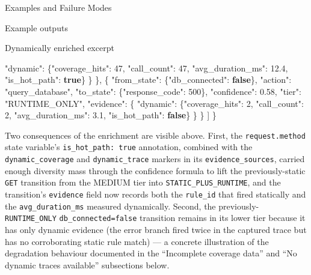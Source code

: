 \documentclass[
  ignorenonframetext,
]{beamer}
\newenvironment{Shaded}{}{}
\newcommand{\DataTypeTok}[1]{\textcolor[rgb]{0.56,0.13,0.00}{#1}}
\newcommand{\DecValTok}[1]{\textcolor[rgb]{0.25,0.63,0.44}{#1}}
\newcommand{\FloatTok}[1]{\textcolor[rgb]{0.25,0.63,0.44}{#1}}
\newcommand{\FunctionTok}[1]{\textcolor[rgb]{0.02,0.16,0.49}{#1}}
\newcommand{\KeywordTok}[1]{\textcolor[rgb]{0.00,0.44,0.13}{\textbf{#1}}}
\newcommand{\OtherTok}[1]{\textcolor[rgb]{0.00,0.44,0.13}{#1}}
\newcommand{\StringTok}[1]{\textcolor[rgb]{0.25,0.44,0.63}{#1}}
\begin{document}
\begin{frame}[fragile]{Examples and Failure Modes}
\begin{block}{Example outputs}
\begin{block}{Dynamically enriched excerpt}
\begin{Shaded}
\begin{Highlighting}[]
        \DataTypeTok{"dynamic"}\FunctionTok{:} \FunctionTok{\{}\DataTypeTok{"coverage\_hits"}\FunctionTok{:} \DecValTok{47}\FunctionTok{,} \DataTypeTok{"call\_count"}\FunctionTok{:} \DecValTok{47}\FunctionTok{,}
                    \DataTypeTok{"avg\_duration\_ms"}\FunctionTok{:} \FloatTok{12.4}\FunctionTok{,} \DataTypeTok{"is\_hot\_path"}\FunctionTok{:} \KeywordTok{true}\FunctionTok{\}}
      \FunctionTok{\}}
    \FunctionTok{\}}\OtherTok{,}
    \FunctionTok{\{}
      \DataTypeTok{"from\_state"}\FunctionTok{:} \FunctionTok{\{}\DataTypeTok{"db\_connected"}\FunctionTok{:} \KeywordTok{false}\FunctionTok{\},}
      \DataTypeTok{"action"}\FunctionTok{:} \StringTok{"query\_database"}\FunctionTok{,}
      \DataTypeTok{"to\_state"}\FunctionTok{:} \FunctionTok{\{}\DataTypeTok{"response\_code"}\FunctionTok{:} \DecValTok{500}\FunctionTok{\},}
      \DataTypeTok{"confidence"}\FunctionTok{:} \FloatTok{0.58}\FunctionTok{,} \DataTypeTok{"tier"}\FunctionTok{:} \StringTok{"RUNTIME\_ONLY"}\FunctionTok{,}
      \DataTypeTok{"evidence"}\FunctionTok{:} \FunctionTok{\{}
        \DataTypeTok{"dynamic"}\FunctionTok{:} \FunctionTok{\{}\DataTypeTok{"coverage\_hits"}\FunctionTok{:} \DecValTok{2}\FunctionTok{,} \DataTypeTok{"call\_count"}\FunctionTok{:} \DecValTok{2}\FunctionTok{,}
                    \DataTypeTok{"avg\_duration\_ms"}\FunctionTok{:} \FloatTok{3.1}\FunctionTok{,} \DataTypeTok{"is\_hot\_path"}\FunctionTok{:} \KeywordTok{false}\FunctionTok{\}}
      \FunctionTok{\}}
    \FunctionTok{\}}
  \OtherTok{]}
\FunctionTok{\}}
\end{Highlighting}
\end{Shaded}

Two consequences of the enrichment are visible above. First, the
\texttt{request.method} state variable's \texttt{is\_hot\_path:\ true}
annotation, combined with the \texttt{dynamic\_coverage} and
\texttt{dynamic\_trace} markers in its \texttt{evidence\_sources},
carried enough diversity mass through the confidence formula to lift the
previously-static \texttt{GET} transition from the MEDIUM tier into
\texttt{STATIC\_PLUS\_RUNTIME}, and the transition's \texttt{evidence}
field now records both the \texttt{rule\_id} that fired statically and
the \texttt{avg\_duration\_ms} measured dynamically. Second, the
previously-\texttt{RUNTIME\_ONLY} \texttt{db\_connected=false}
transition remains in its lower tier because it has only dynamic
evidence (the error branch fired twice in the captured trace but has no
corroborating static rule match) --- a concrete illustration of the
degradation behaviour documented in the ``Incomplete coverage data'' and
``No dynamic traces available'' subsections below.
\end{block}


\end{block}
\end{frame}
\end{document}
